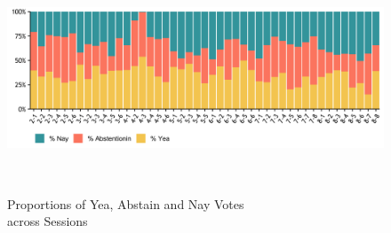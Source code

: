\begin{figure}[ht]
    \centering
    \includegraphics[width=14cm, height=6.8cm]{02-Chapter-Two/image/mean_rollcall.png}
    \caption{Proportions of Yea, Abstain  and Nay Votes \\ across Sessions}
    \label{fig:vote-distribution}
\end{figure}
